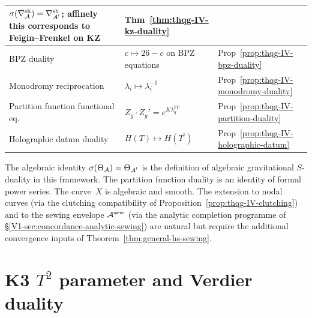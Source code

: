 \begin{center}
\begin{tabular}{|>{\raggedright\arraybackslash}p{5.5cm}|%
 >{\raggedright\arraybackslash}p{5.5cm}|%
 >{\raggedright\arraybackslash}p{3cm}|}
$\sigma(\nabla^{\mathrm{sh}}_{\mathcal{A}})=\nabla^{\mathrm{sh}}_{\mathcal{A}^!}$;
affinely this corresponds to Feigin--Frenkel on KZ &
Thm~\ref{thm:thqg-IV-kz-duality} \\
\hline
BPZ duality &
$c \mapsto 26-c$ on BPZ equations &
Prop~\ref{prop:thqg-IV-bpz-duality} \\
\hline
Monodromy reciprocation &
$\lambda_i \mapsto \lambda_i^{-1}$ &
Prop~\ref{prop:thqg-IV-monodromy-duality} \\
\hline
Partition function functional eq. &
$Z_g \cdot Z_g' = e^{K\lambda_g^{\mathrm{FP}}}$ &
Prop~\ref{prop:thqg-IV-partition-duality} \\
\hline
Holographic datum duality &
$H(T) \mapsto H(T^!)$ &
Prop~\ref{prop:thqg-IV-holographic-datum} \\
\hline
\end{tabular}
\end{center}

\begin{remark}
The algebraic identity $\sigma(\Theta_{\mathcal{A}}) = \Theta_{\mathcal{A}^!}$ is the
definition of algebraic gravitational $S$-duality in this framework. The
partition function duality is an identity of formal power series.
The curve~$X$ is algebraic and smooth. The extension to nodal
curves (via the clutching compatibility of
Proposition~\ref{prop:thqg-IV-clutching}) and to the sewing envelope
$\mathcal{A}^{\mathrm{sew}}$ (via the analytic completion programme of
\S\ref{V1-sec:concordance-analytic-sewing}) are natural but require
the additional convergence inputs of Theorem~\ref{thm:general-hs-sewing}.
\end{remark}

\section{K3 \texorpdfstring{$T^2$}{T2} parameter and Verdier duality}
\label{sec:grav-sdual-supplement}

